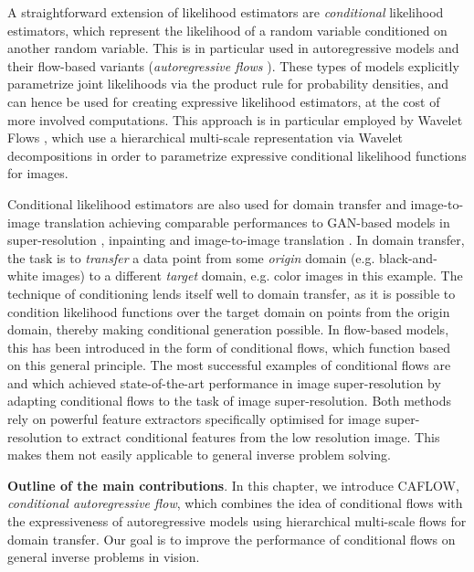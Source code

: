 A straightforward extension of likelihood estimators are \emph{conditional} likelihood estimators, which represent the likelihood of a random variable conditioned on another random variable. This is in particular used in autoregressive models and their flow-based variants (\emph{autoregressive flows} \cite{autoregressive_flows}). These types of models explicitly parametrize joint likelihoods via the product rule for probability densities, and can hence be used for creating expressive likelihood estimators, at the cost of more involved computations. This approach is in particular employed by Wavelet Flows \cite{WAVELET-FLOW}, which use a hierarchical multi-scale representation via Wavelet decompositions in order to parametrize expressive conditional likelihood functions for images.

Conditional likelihood estimators are also used for domain transfer and image-to-image translation \cite{Dual-Glow, SRFLOW, ardizzone2019guided, cGLOW} achieving comparable performances to GAN-based models in super-resolution \cite{SRFLOW, HCFLOW}, inpainting \cite{cGLOW} and image-to-image translation \cite{Pumarola2020, Dual-Glow, grover2020alignflow}. In domain transfer, the task is to \emph{transfer} a data point from some \emph{origin} domain (e.g. black-and-white images) to a different \emph{target} domain, e.g. color images in this example. The technique of conditioning lends itself well to domain transfer, as it is possible to condition likelihood functions over the target domain on points from the origin domain, thereby making conditional generation possible. In flow-based models, this has been introduced in the form of conditional flows, which function based on this general principle. The most successful examples of conditional flows are \cite{SRFLOW} and \cite{HCFLOW} which achieved state-of-the-art performance in image super-resolution by adapting conditional flows to the task of image super-resolution. Both methods rely on powerful feature extractors specifically optimised for image super-resolution to extract conditional features from the low resolution image. This makes them not easily applicable to general inverse problem solving.

\medskip

\textbf{Outline of the main contributions}. In this chapter, we introduce CAFLOW, \emph{conditional autoregressive flow}, which combines the idea of conditional flows with the expressiveness of autoregressive models using hierarchical multi-scale flows for domain transfer. Our goal is to improve the performance of conditional flows on %
general inverse problems in vision.\color{black}

